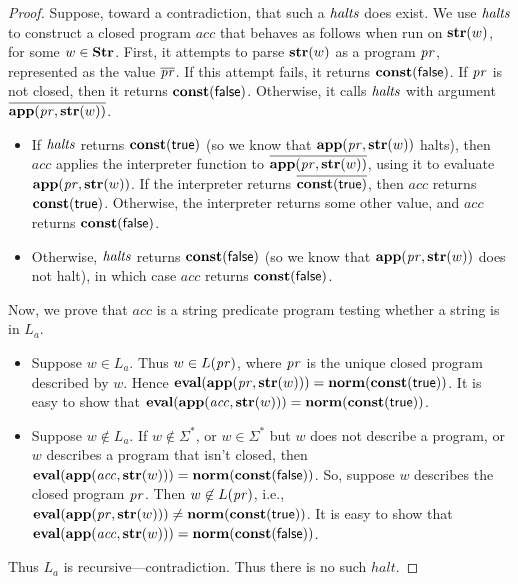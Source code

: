 \begin{proof}
Suppose, toward a contradiction, that such a $\mathit{halts}$ does exist.  We
use $\mathit{halts}$ to construct a closed program $\mathit{acc}$ that behaves as
follows when run on $\mathbf{str}(w)$, for some $w\in\mathbf{Str}$.  First, it
attempts to parse $\mathbf{str}(w)$ as a program $\mathit{pr}$, represented as
the value $\overline{\mathit{pr}}$.  If this attempt fails, it returns
$\mathbf{const}(\mathsf{false})$.  If $\mathit{pr}$ is not closed, then it returns
$\mathbf{const}(\mathsf{false})$.  Otherwise, it calls $\mathit{halts}$ with argument
$\overline{\mathbf{app}(\mathit{pr},\mathbf{str}(w))}$.

\begin{itemize}
\item If $\mathit{halts}$ returns $\mathbf{const}(\mathsf{true})$ (so we know that
  $\mathbf{app}(\mathit{pr},\mathbf{str}(w))$ halts), then $\mathit{acc}$ applies the
  interpreter function to $\overline{\mathbf{app}(\mathit{pr},\mathbf{str}(w))}$,
  using it to evaluate $\mathbf{app}(\mathit{pr},\mathbf{str}(w))$.  If the
  interpreter returns $\overline{\mathbf{const}(\mathsf{true})}$, then
  $\mathit{acc}$ returns $\mathbf{const}(\mathsf{true})$.  Otherwise, the
  interpreter returns some other value, and $\mathit{acc}$ returns
  $\mathbf{const}(\mathsf{false})$.

\item Otherwise, $\mathit{halts}$ returns $\mathbf{const}(\mathsf{false})$ (so we know that
  $\mathbf{app}(\mathit{pr},\mathbf{str}(w))$ does not halt), in which case
  $\mathit{acc}$ returns $\mathbf{const}(\mathsf{false})$.
\end{itemize}

Now, we prove that $\mathit{acc}$ is a string predicate program
testing whether a string is in $L_a$.

\begin{itemize}
\item Suppose $w\in L_a$.  Thus $w\in L(\mathit{pr})$, where $\mathit{pr}$ is the
  unique closed program described by $w$.  Hence
  $\mathbf{eval}(\mathbf{app}(\mathit{pr},\mathbf{str}(w))) = \mathbf{norm}(\mathbf{const}(\mathsf{true}))$.  It
  is easy to show that $\mathbf{eval}(\mathbf{app}(\mathit{acc},\mathbf{str}(w))) =
  \mathbf{norm}(\mathbf{const}(\mathsf{true}))$.

\item Suppose $w\not\in L_a$.  If $w\not\in\Sigma^*$, or
  $w\in\Sigma^*$ but $w$ does not describe a program, or $w$ describes
  a program that isn't closed, then $\mathbf{eval}(\mathbf{app}(\mathit{acc},\mathbf{str}(w)))
  = \mathbf{norm}(\mathbf{const}(\mathsf{false}))$.  So, suppose $w$ describes the closed
  program $\mathit{pr}$.  Then $w\not\in L(\mathit{pr})$, i.e.,
  $\mathbf{eval}(\mathbf{app}(\mathit{pr},\mathbf{str}(w))) \neq \mathbf{norm}(\mathbf{const}(\mathsf{true}))$.
  It is easy to show that $\mathbf{eval}(\mathbf{app}(\mathit{acc},\mathbf{str}(w))) =
  \mathbf{norm}(\mathbf{const}(\mathsf{false}))$.
\end{itemize}

Thus $L_a$ is recursive---contradiction.  Thus there is no such
$\mathit{halt}$.
\end{proof}


